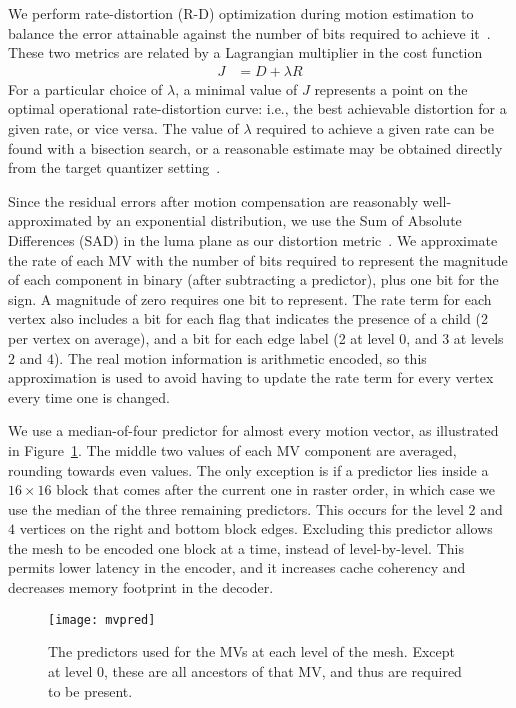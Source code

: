 \documentclass[11pt,letterpaper]{article}
\begin{document}
We perform rate-distortion (R-D) optimization during motion estimation to
 balance the error attainable against the number of bits required to achieve
 it~\cite{OR98}.
These two metrics are related by a Lagrangian multiplier in the cost function
\begin{align}
J & = D+\lambda R
\end{align}
For a particular choice of $\lambda$, a minimal value of $J$ represents a point
 on the optimal operational rate-distortion curve: i.e., the best achievable
 distortion for a given rate, or vice versa.
The value of $\lambda$ required to achieve a given rate can be found with a
 bisection search, or a reasonable estimate may be obtained directly from the
 target quantizer setting~\cite{SW98}.

Since the residual errors after motion compensation are reasonably
 well-approximated by an exponential distribution, we use the Sum of Absolute
 Differences (SAD) in the luma plane as our distortion metric~\cite{SLH00}.
We approximate the rate of each MV with the number of bits required to
 represent the magnitude of each component in binary (after subtracting a
 predictor), plus one bit for the sign.
A magnitude of zero requires one bit to represent.
The rate term for each vertex also includes a bit for each flag that indicates
 the presence of a child (2 per vertex on average), and a bit for each edge
 label (2 at level $0$, and 3 at levels $2$ and $4$).
The real motion information is arithmetic encoded, so this approximation is used
 to avoid having to update the rate term for every vertex every time one is
 changed.

We use a median-of-four predictor for almost every motion vector, as
 illustrated in Figure~\ref{fig:mvpred}.
The middle two values of each MV component are averaged, rounding towards even
 values.
The only exception is if a predictor lies inside a $16\times 16$ block that
 comes after the current one in raster order, in which case we use the median
 of the three remaining predictors.
This occurs for the level $2$ and $4$ vertices on the right and bottom block
 edges.
Excluding this predictor allows the mesh to be encoded one block at a time,
 instead of level-by-level.
This permits lower latency in the encoder, and it increases cache coherency and
 decreases memory footprint in the decoder.

\begin{figure}[tb]
\center
\texttt{[image: mvpred]}
\caption{The predictors used for the MVs at each level of the mesh.
Except at level $0$, these are all ancestors of that MV, and thus are required
 to be present.}
\label{fig:mvpred}
\end{figure}
\end{document}
